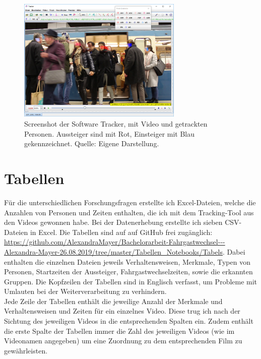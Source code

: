 \begin{figure}[H]
	\centering
		\includegraphics[width=0.7\textwidth]{pictures/data_extraction/tracking/trackExample.png}
	\caption{Screenshot der Software \textsf{Tracker}, mit Video und getrackten Personen. Aussteiger sind mit Rot, Einsteiger mit Blau gekennzeichnet. Quelle: Eigene Darstellung.}
	\label{fig:tracking}
\end{figure}
\section{Tabellen} \label{Tabellen}
Für die unterschiedlichen Forschungsfragen erstellte ich Excel-Dateien, welche die Anzahlen von Personen und Zeiten enthalten, die ich mit dem Tracking-Tool aus den Videos gewonnen habe. Bei der Datenerhebung erstellte ich sieben CSV-Dateien in Excel. Die Tabellen sind auf auf GitHub frei zugänglich: \url{https://github.com/AlexandraMayer/Bachelorarbeit-Fahrgastwechsel---Alexandra-Mayer-26.08.2019/tree/master/Tabellen_Notebooks/Tabels}. Dabei enthalten die einzelnen Dateien jeweils  Verhaltensweisen, Merkmale, Typen von Personen, Startzeiten der Aussteiger, Fahrgastwechselzeiten, sowie die erkannten Gruppen. Die Kopfzeilen der Tabellen sind in Englisch verfasst, um Probleme mit Umlauten bei der Weiterverarbeitung zu verhindern. \\
Jede Zeile der Tabellen enthält die jeweilige Anzahl der Merkmale und Verhaltensweisen und Zeiten für ein einzelnes Video. Diese trug ich nach der Sichtung des jeweiligen Videos in die entsprechenden Spalten ein. Zudem enthält die erste Spalte der Tabellen immer die Zahl des jeweiligen Videos (wie im Videonamen angegeben) um eine Zuordnung zu dem entsprechenden Film zu gewährleisten.
